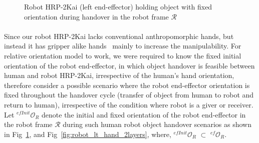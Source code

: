 \begin{figure}[ht]
	\caption{Robot HRP-2Kai (left end-effector) holding object with fixed orientation during handover in the robot frame $\mathcal{R}$}
	\label{fig:robot_lt_hand_obj}
\end{figure} 

\paragraph*{}
Since our robot HRP-2Kai lacks conventional anthropomorphic hands, but instead it has gripper alike hands~\cite{kaneko2015humanoid, stasse2019overview} mainly to increase the manipulability. For relative orientation model to work, we were required to know the fixed initial orientation of the robot end-effector, in which object handover is feasible between human and robot HRP-2Kai, irrespective of the human's hand orientation, therefore consider a possible  scenario where the robot end-effector orientation is fixed throughout the handover cycle (transfer of object from human to robot and return to human), irrespective of the condition where robot is a giver or receiver. Let ${{}^{efInit}\mathcal{O}_R}$ denote the initial and fixed orientation of the robot end-effector in the robot frame $\mathcal{R}$ during such human robot object handover scenarios as shown in Fig~\ref{fig:robot_lt_hand_obj}, and Fig~\ref{fig:robot_lt_hand_2layers}, where, ${{}^{efInit}\mathcal{O}_R}$ $\subset$ ${{}^{ef}\mathcal{O}_R}$.

